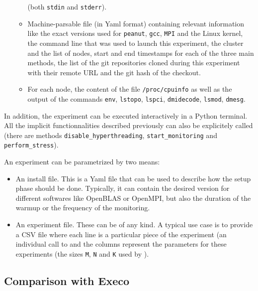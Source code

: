 \begin{itemize}
\begin{itemize}
                            (both \texttt{stdin} and \texttt{stderr}).
                        \item Machine-parsable file (in Yaml format) containing relevant information like
                            the exact versions used for \texttt{peanut}, \texttt{gcc}, \texttt{MPI} and the Linux
                            kernel, the command line that was used to launch this experiment, the cluster and the list
                            of nodes, start and end timestamps for each of the three main methods, the list of the git
                            repositories cloned during this experiment with their remote URL and the git hash of the
                            checkout.
                        \item For each node, the content of the file \texttt{/proc/cpuinfo} as well as the output of the
                            commands \texttt{env}, \texttt{lstopo}, \texttt{lspci}, \texttt{dmidecode},
                            \texttt{lsmod}, \texttt{dmesg}.
                    \end{itemize}
            \end{itemize}
            In addition, the experiment can be executed interactively in a Python terminal. All the implicit
            functionnalities described previously can also be explicitely called (\eg there are methods
            \texttt{disable\_hyperthreading}, \texttt{start\_monitoring} and \texttt{perform\_stress}).

            An experiment can be parametrized by two means:
            \begin{itemize}
                \item An install file. This is a Yaml file that can be used to describe how the setup phase should be
                    done. Typically, it can contain the desired version for different softwares like OpenBLAS or
                    OpenMPI, but also the duration of the warmup or the frequency of the monitoring.
                \item An experiment file. These can be of any kind. A typical use case is to provide a CSV file where
                    each line is a particular piece of the experiment (\eg an individual call to \dgemm and the
                    columns represent the parameters for these experiments (\eg the sizes \texttt{M}, \texttt{N} and
                    \texttt{K} used by \dgemm).
            \end{itemize}

        \subsection{Comparison with Execo}%
        \label{sub:comparison_with_execo}

